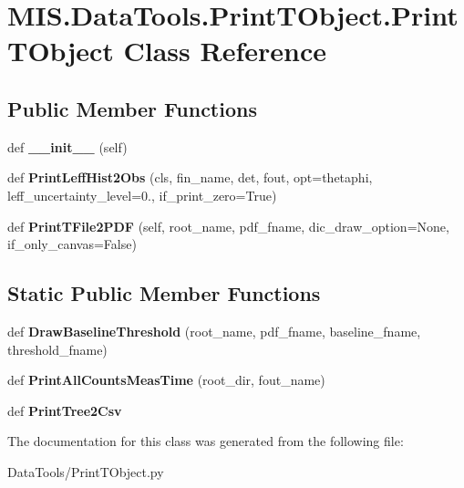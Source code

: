 \hypertarget{classMIS_1_1DataTools_1_1PrintTObject_1_1PrintTObject}{}\section{M\+I\+S.\+Data\+Tools.\+Print\+T\+Object.\+Print\+T\+Object Class Reference}
\label{classMIS_1_1DataTools_1_1PrintTObject_1_1PrintTObject}
\subsection*{Public Member Functions}
\begin{DoxyCompactItemize}
\item 
\mbox{\label{classMIS_1_1DataTools_1_1PrintTObject_1_1PrintTObject_aa382e13e01ec8abd7705195b07e1263a}} 
def {\bfseries \+\_\+\+\_\+init\+\_\+\+\_\+} (self)
\item 
\mbox{\label{classMIS_1_1DataTools_1_1PrintTObject_1_1PrintTObject_ae69ec6b5d460b58ef3355658f1c076c7}} 
def {\bfseries Print\+Leff\+Hist2\+Obs} (cls, fin\+\_\+name, det, fout, opt=\textquotesingle{}thetaphi\textquotesingle{}, leff\+\_\+uncertainty\+\_\+level=0., if\+\_\+print\+\_\+zero=True)
\item 
\mbox{\label{classMIS_1_1DataTools_1_1PrintTObject_1_1PrintTObject_ab911ac5dbce151040118c18675055610}} 
def {\bfseries Print\+T\+File2\+P\+DF} (self, root\+\_\+name, pdf\+\_\+fname, dic\+\_\+draw\+\_\+option=None, if\+\_\+only\+\_\+canvas=False)
\end{DoxyCompactItemize}
\subsection*{Static Public Member Functions}
\begin{DoxyCompactItemize}
\item 
\mbox{\label{classMIS_1_1DataTools_1_1PrintTObject_1_1PrintTObject_ad5638222988b00333fa68623332d7a3a}} 
def {\bfseries Draw\+Baseline\+Threshold} (root\+\_\+name, pdf\+\_\+fname, baseline\+\_\+fname, threshold\+\_\+fname)
\item 
\mbox{\label{classMIS_1_1DataTools_1_1PrintTObject_1_1PrintTObject_af78197dd289db5fe9ecab57425800b4a}} 
def {\bfseries Print\+All\+Counts\+Meas\+Time} (root\+\_\+dir, fout\+\_\+name)
\item 
\mbox{\label{classMIS_1_1DataTools_1_1PrintTObject_1_1PrintTObject_a718cf70728a1792032c06e93a188febe}} 
def {\bfseries Print\+Tree2\+Csv}
\end{DoxyCompactItemize}


The documentation for this class was generated from the following file\+:\begin{DoxyCompactItemize}
\item 
Data\+Tools/Print\+T\+Object.\+py\end{DoxyCompactItemize}
